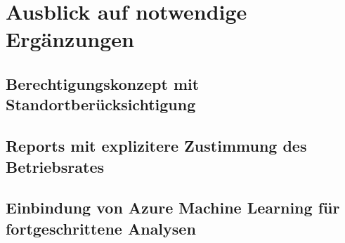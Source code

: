 \section{Ausblick auf notwendige Ergänzungen} \label{sec:praktischeUmsetzung:ausblick}

\subsection{Berechtigungskonzept mit Standortberücksichtigung}

\subsection{Reports mit explizitere Zustimmung des Betriebsrates}

\subsection{Einbindung von Azure Machine Learning für fortgeschrittene Analysen}